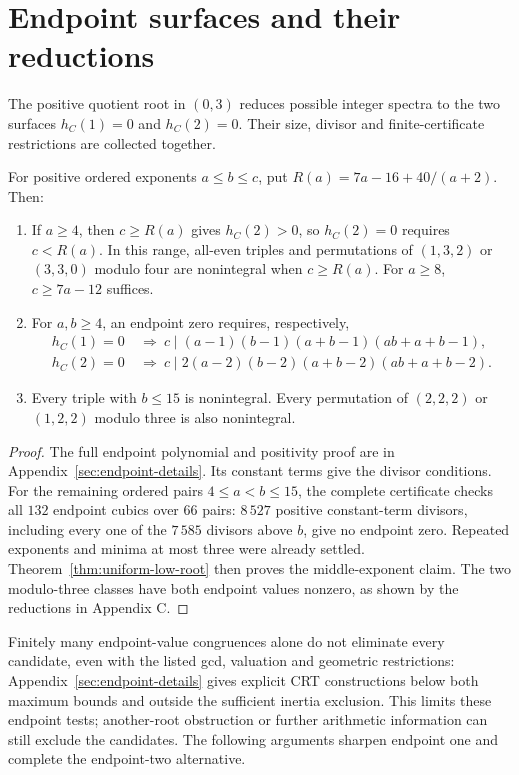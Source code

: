 \section{Endpoint surfaces and their reductions}
\label{sec:endpoint-reduction}

The positive quotient root in $(0,3)$ reduces possible integer spectra
to the two surfaces $h_C(1)=0$ and $h_C(2)=0$. Their size, divisor and
finite-certificate restrictions are collected together.

\begin{theorem}
\label{thm:endpoint-reduction}
For positive ordered exponents $a\leq b\leq c$, put
$R(a)=7a-16+40/(a+2)$. Then:
\begin{enumerate}
\item If $a\geq4$, then $c\geq R(a)$ gives $h_C(2)>0$, so
$h_C(2)=0$ requires $c<R(a)$. In this range, all-even triples and
permutations of $(1,3,2)$ or $(3,3,0)$ modulo four are nonintegral
when $c\geq R(a)$. For $a\geq8$, $c\geq7a-12$ suffices.
\item For $a,b\geq4$, an endpoint zero requires, respectively,
\begin{align*}
 h_C(1)=0&\ \Longrightarrow\ c\mid(a-1)(b-1)(a+b-1)(ab+a+b-1),\\
 h_C(2)=0&\ \Longrightarrow\ c\mid2(a-2)(b-2)(a+b-2)(ab+a+b-2).
\end{align*}
\item Every triple with $b\leq15$ is nonintegral. Every permutation
of $(2,2,2)$ or $(1,2,2)$ modulo three is also nonintegral.
\end{enumerate}
\end{theorem}

\begin{proof}
The full endpoint polynomial and positivity proof are in
Appendix~\ref{sec:endpoint-details}. Its constant terms give the divisor
conditions. For the remaining ordered pairs $4\leq a<b\leq15$, the
complete certificate checks all $132$ endpoint cubics over $66$ pairs:
$8\,527$ positive constant-term divisors, including every one of the
$7\,585$ divisors above $b$, give no endpoint zero. Repeated exponents
and minima at most three were already settled. Theorem~\ref{thm:uniform-low-root}
then proves the middle-exponent claim. The two modulo-three classes have
both endpoint values nonzero, as shown by the reductions in Appendix C.
\end{proof}

Finitely many endpoint-value congruences alone do not eliminate every
candidate, even with the listed gcd, valuation and geometric restrictions:
Appendix~\ref{sec:endpoint-details} gives explicit CRT constructions
below both maximum bounds and outside the sufficient inertia exclusion.
This limits these endpoint tests; another-root obstruction or further
arithmetic information can still exclude the candidates. The following
arguments sharpen endpoint one and complete the endpoint-two alternative.


